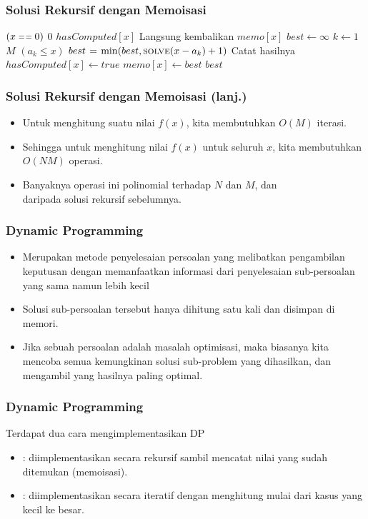 \begin{frame}
\frametitle{Solusi Rekursif dengan Memoisasi}
\begin{codebox}
\li \If $(x \isequal 0)$ \Then
\li   \Return $0$
\li \ElseIf $hasComputed[x]$ \Then
\li   \Comment Langsung kembalikan
\li   \Return $memo[x]$ 
\li \Else
\li   $best \gets \infty$
\li   \For $k \gets 1$ \To $M$ \Do
\li     \If $(a_k \leq x)$ \Then
\li       $best \mathrel{\hspace{1pt}=\hspace{1pt}} \min(best, \textnormal{\scshape solve}(x - a_k) + 1)$
        \End
      \End
\li   \Comment Catat hasilnya      
\li   $hasComputed[x] \gets true$
\li   $memo[x] \gets best$
\li   \Return $best$
    \End
\end{codebox}
\end{frame}

\begin{frame}
\frametitle{Solusi Rekursif dengan Memoisasi (lanj.)}
\begin{itemize}
  \item Untuk menghitung suatu nilai $f(x)$, kita membutuhkan $O(M)$ iterasi.
  \item Sehingga untuk menghitung nilai $f(x)$ untuk seluruh $x$, kita membutuhkan $O(NM)$ operasi.
  \item Banyaknya operasi ini polinomial terhadap $N$ dan $M$, dan \\  daripada solusi rekursif sebelumnya.
\end{itemize}
\end{frame}

\begin{frame} 
\frametitle{Dynamic Programming}
\begin{itemize}
  \item Merupakan metode penyelesaian persoalan yang melibatkan pengambilan keputusan dengan memanfaatkan informasi dari penyelesaian sub-persoalan yang sama namun lebih kecil
  \item Solusi sub-persoalan tersebut hanya dihitung satu kali dan disimpan di memori.
  \item Jika sebuah persoalan adalah masalah optimisasi, maka biasanya kita mencoba semua kemungkinan solusi sub-problem yang dihasilkan, dan  mengambil yang hasilnya paling optimal. 
\end{itemize}
\end{frame}

\begin{frame} 
\frametitle{Dynamic Programming}
Terdapat dua cara mengimplementasikan DP
\begin{itemize}
  \item \newTerm{\fTopdown}: diimplementasikan secara rekursif sambil mencatat nilai yang sudah ditemukan (memoisasi).
  \item \newTerm{\fBottomup}: diimplementasikan secara iteratif dengan menghitung mulai dari kasus yang kecil ke besar.
  \newline
\end{itemize}
\end{frame}

